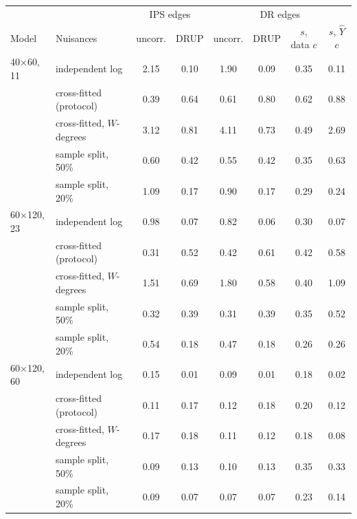\begin{tabular}{llcccccc}
\toprule
 & & \multicolumn{2}{c}{IPS edges} & \multicolumn{4}{c}{DR edges}\\
Model & Nuisances & uncorr. & DRUP & uncorr. & DRUP & $s$, data $c$ & $s$, $\hat Y$ $c$\\
\midrule
40$\times$60, 11 & independent log & 2.15 & 0.10 & 1.90 & 0.09 & 0.35 & 0.11\\
 & cross-fitted (protocol) & 0.39 & 0.64 & 0.61 & 0.80 & 0.62 & 0.88\\
 & cross-fitted, $W$-degrees & 3.12 & 0.81 & 4.11 & 0.73 & 0.49 & 2.69\\
 & sample split, 50\% & 0.60 & 0.42 & 0.55 & 0.42 & 0.35 & 0.63\\
 & sample split, 20\% & 1.09 & 0.17 & 0.90 & 0.17 & 0.29 & 0.24\\
\midrule
60$\times$120, 23 & independent log & 0.98 & 0.07 & 0.82 & 0.06 & 0.30 & 0.07\\
 & cross-fitted (protocol) & 0.31 & 0.52 & 0.42 & 0.61 & 0.42 & 0.58\\
 & cross-fitted, $W$-degrees & 1.51 & 0.69 & 1.80 & 0.58 & 0.40 & 1.09\\
 & sample split, 50\% & 0.32 & 0.39 & 0.31 & 0.39 & 0.35 & 0.52\\
 & sample split, 20\% & 0.54 & 0.18 & 0.47 & 0.18 & 0.26 & 0.26\\
\midrule
60$\times$120, 60 & independent log & 0.15 & 0.01 & 0.09 & 0.01 & 0.18 & 0.02\\
 & cross-fitted (protocol) & 0.11 & 0.17 & 0.12 & 0.18 & 0.20 & 0.12\\
 & cross-fitted, $W$-degrees & 0.17 & 0.18 & 0.11 & 0.12 & 0.18 & 0.08\\
 & sample split, 50\% & 0.09 & 0.13 & 0.10 & 0.13 & 0.35 & 0.33\\
 & sample split, 20\% & 0.09 & 0.07 & 0.07 & 0.07 & 0.23 & 0.14\\
\bottomrule
\end{tabular}
